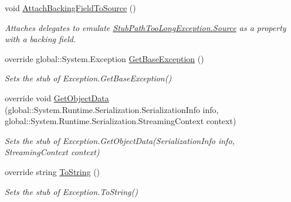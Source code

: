 \begin{DoxyCompactItemize}
void \hyperlink{class_system_1_1_i_o_1_1_fakes_1_1_stub_path_too_long_exception_aca41a1cf0cb5cc34e555001f57f08b41}{Attach\-Backing\-Field\-To\-Source} ()
\begin{DoxyCompactList}\small\item\em Attaches delegates to emulate \hyperlink{class_system_1_1_i_o_1_1_fakes_1_1_stub_path_too_long_exception_a50004971c2fba15f5a66592850d06a0c}{Stub\-Path\-Too\-Long\-Exception.\-Source} as a property with a backing field.\end{DoxyCompactList}\item 
override global\-::\-System.\-Exception \hyperlink{class_system_1_1_i_o_1_1_fakes_1_1_stub_path_too_long_exception_aba21d54fccab5f12b1d8e9185ef7b9df}{Get\-Base\-Exception} ()
\begin{DoxyCompactList}\small\item\em Sets the stub of Exception.\-Get\-Base\-Exception()\end{DoxyCompactList}\item 
override void \hyperlink{class_system_1_1_i_o_1_1_fakes_1_1_stub_path_too_long_exception_a05e60ddd7aafea6e366ff85039cf3fe6}{Get\-Object\-Data} (global\-::\-System.\-Runtime.\-Serialization.\-Serialization\-Info info, global\-::\-System.\-Runtime.\-Serialization.\-Streaming\-Context context)
\begin{DoxyCompactList}\small\item\em Sets the stub of Exception.\-Get\-Object\-Data(\-Serialization\-Info info, Streaming\-Context context)\end{DoxyCompactList}\item 
override string \hyperlink{class_system_1_1_i_o_1_1_fakes_1_1_stub_path_too_long_exception_a639ea377bb3f788680f2b04cd11256a7}{To\-String} ()
\begin{DoxyCompactList}\small\item\em Sets the stub of Exception.\-To\-String()\end{DoxyCompactList}\end{DoxyCompactItemize}
